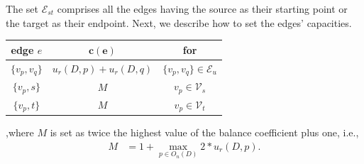 \documentclass[runningheads]{llncs}
\begin{document}
The set $\mathcal{E}_{st}$ comprises all the edges having the source as their starting point or the target as their endpoint. Next, we describe how to set the edges' capacities.

\begin{center}
\begin{tabular}{|c|c|c|}
\hline
\textbf{edge} $e$ & $\mathbf{c(e)}$ & \textbf{for}\\
\hline
$\{v_p, v_q\}$ & $ u_r(D,p) + u_r(D,q) $ & $\{v_p,v_q\} \in \mathcal{E}_{u}$\\
\hline
$\{v_p, s\}$ & $M$ & $v_p \in \mathcal{V}_{s}$ \\
\hline
$\{v_p, t\}$ & $M$ & $v_p \in \mathcal{V}_{t}$ \\
\hline
\end{tabular}
\end{center}


,where $M$ is set as twice the highest value of the balance coefficient plus one, i.e.,
\begin{align*}
	M &= 1+\max_{p \in O_n(D)} 2*u_r(D,p).
\end{align*}
%
\end{document}
